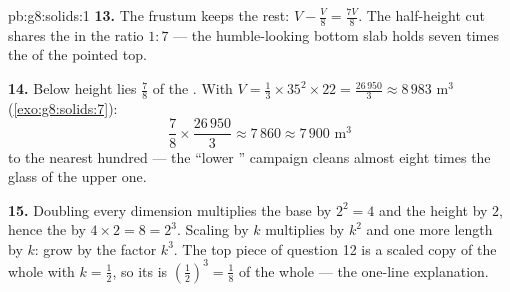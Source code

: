 \begin{solution}{pb:g8:solids:1}
\textbf{13.} The frustum keeps the rest:
$V - \frac V8 = \frac{7V}{8}$. The half-height cut shares the
 in the ratio $1 : 7$ --- the humble-looking bottom slab
holds seven times the  of the pointed top.

\textbf{14.} Below  height lies $\frac78$ of the . With
$V = \frac13 \times 35^2 \times 22 = \frac{26\,950}{3} \approx
8\,983$ m$^3$ (\cref{exo:g8:solids:7}):
\[
\frac78 \times \frac{26\,950}{3} \approx 7\,860 \approx
7\,900 \text{ m}^3
\]
to the nearest hundred --- the ``lower '' campaign cleans
almost eight times the glass  of the upper one.

\textbf{15.} Doubling every dimension multiplies the base  by
$2^2 = 4$ and the height by $2$, hence the  by
$4 \times 2 = 8 = 2^3$. Scaling by $k$ multiplies  by $k^2$
and one more length by $k$:  grow by the factor $k^3$. The
top piece of question 12 is a scaled copy of the whole 
with $k = \frac12$, so its  is
$\left(\frac12\right)^3 = \frac18$ of the whole --- the one-line
explanation.
\end{solution}
